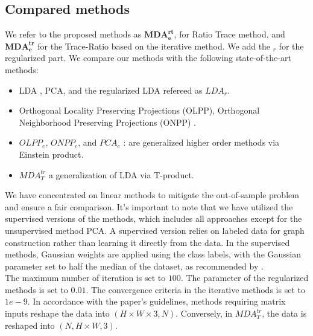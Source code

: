 \documentclass{siamltex}
\begin{document}
\subsection{Compared methods}
We refer to the proposed methods as $\boldsymbol{MDA_e^{rt}}$, for Ratio Trace method, and $\boldsymbol{MDA_e^{tr}}$ for the Trace-Ratio based on the iterative method. We add the $_r$ for the regularized part. We compare our methods with the following state-of-the-art methods: 
\begin{itemize}
\item LDA \cite{fukunaga2013introduction}, PCA, and the regularized LDA refereed as $LDA_r$.
\item Orthogonal Locality Preserving Projections (OLPP), Orthogonal Neighborhood Preserving Projections (ONPP) \cite{kokiopoulou2007orthogonal}.
\item $OLPP_e$, $ONPP_e$, and $PCA_e$ \cite{zahir2024higher}: are generalized higher order methods via Einstein product.
\item $MDA_T^{tr}$ \cite{dufrenois2023multilinear} a generalization of LDA via T-product.
\end{itemize}
We have concentrated on linear methods to mitigate the out-of-sample problem and ensure a fair comparison. It’s important to note that we have utilized the supervised versions of the methods, which includes all approaches except for the unsupervised method PCA. A supervised version relies on labeled data for graph construction rather than learning it directly from the data. In the supervised methods, Gaussian weights are applied using the class labels, with the Gaussian parameter set to half the median of the dataset, as recommended by \cite{kokiopoulou2009enhanced}.\\
The maximum number of iteration is set to $100$. The parameter of the regularized methods is set to $0.01$. The convergence criteria in the iterative methods is set to $1e-9$.
In accordance with the paper’s guidelines, methods requiring matrix inputs reshape the data into \((H \times W \times 3, N)\). Conversely, in \(MDA_T^{tr}\), the data is reshaped into \((N, H \times W, 3)\).
\end{document}
